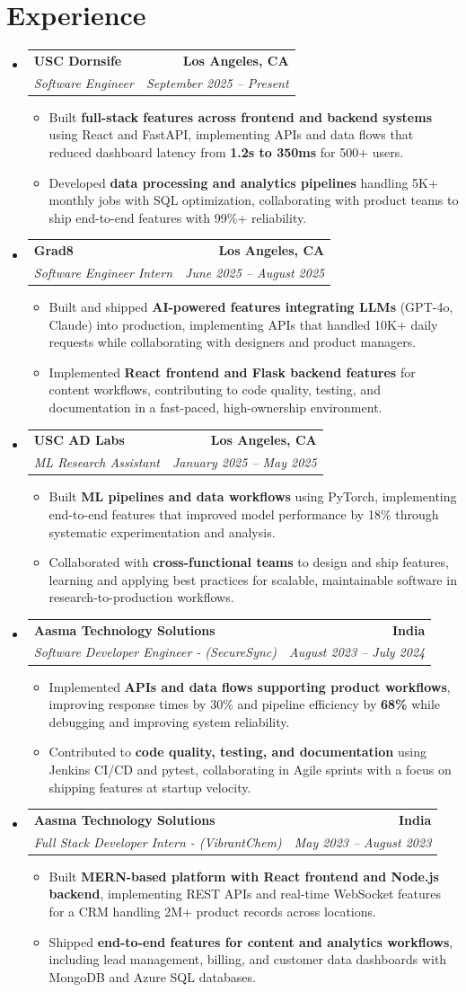 \documentclass[letterpaper,10pt]{article}
\makeatletter
\newcommand{\resumeItem}[1]{\item\small{{#1 \vspace{-2pt}}}}
\newcommand{\resumeSubheading}[4]{\vspace{-1pt}\item\begin{tabular*}{1.0\textwidth}[t]{l@{\extracolsep{\fill}}r}\textbf{#1} & \textbf{\small #2} \\\textit{\small#3} & \textit{\small #4} \\\end{tabular*}\vspace{-2pt}}
\newcommand{\resumeSubHeadingListStart}{\begin{itemize}[leftmargin=0.0in, label={}]}
\newcommand{\resumeSubHeadingListEnd}{\end{itemize}}
\newcommand{\resumeItemListStart}{\begin{itemize}[leftmargin=0.15in,label=\textbullet,itemsep=2pt,topsep=0pt,parsep=0pt,partopsep=0pt]}
\newcommand{\resumeItemListEnd}{\end{itemize}\vspace{-4pt}}
\makeatother
\begin{document}
\section{Experience}
\resumeSubHeadingListStart
\resumeSubheading{USC Dornsife}{Los Angeles, CA}{Software Engineer}{September 2025 -- Present}
\resumeItemListStart
\resumeItem{Built \textbf{full-stack features across frontend and backend systems} using React and FastAPI, implementing APIs and data flows that reduced dashboard latency from \textbf{1.2s to 350ms} for 500+ users.}
\resumeItem{Developed \textbf{data processing and analytics pipelines} handling 5K+ monthly jobs with SQL optimization, collaborating with product teams to ship end-to-end features with 99\%+ reliability.}
\resumeItemListEnd
\resumeSubheading{Grad8}{Los Angeles, CA}{Software Engineer Intern}{June 2025 -- August 2025}
\resumeItemListStart
\resumeItem{Built and shipped \textbf{AI-powered features integrating LLMs} (GPT-4o, Claude) into production, implementing APIs that handled 10K+ daily requests while collaborating with designers and product managers.}
\resumeItem{Implemented \textbf{React frontend and Flask backend features} for content workflows, contributing to code quality, testing, and documentation in a fast-paced, high-ownership environment.}
\resumeItemListEnd
\resumeSubheading{USC AD Labs}{Los Angeles, CA}{ML Research Assistant}{January 2025 -- May 2025}
\resumeItemListStart
\resumeItem{Built \textbf{ML pipelines and data workflows} using PyTorch, implementing end-to-end features that improved model performance by 18\% through systematic experimentation and analysis.}
\resumeItem{Collaborated with \textbf{cross-functional teams} to design and ship features, learning and applying best practices for scalable, maintainable software in research-to-production workflows.}
\resumeItemListEnd
\resumeSubheading{Aasma Technology Solutions}{India}{Software Developer Engineer - (SecureSync)}{August 2023 -- July 2024}
\resumeItemListStart
\resumeItem{Implemented \textbf{APIs and data flows supporting product workflows}, improving response times by 30\% and pipeline efficiency by \textbf{68\%} while debugging and improving system reliability.}
\resumeItem{Contributed to \textbf{code quality, testing, and documentation} using Jenkins CI/CD and pytest, collaborating in Agile sprints with a focus on shipping features at startup velocity.}
\resumeItemListEnd
\resumeSubheading{Aasma Technology Solutions}{India}{Full Stack Developer Intern - (VibrantChem)}{May 2023 -- August 2023}
\resumeItemListStart
\resumeItem{Built \textbf{MERN-based platform with React frontend and Node.js backend}, implementing REST APIs and real-time WebSocket features for a CRM handling 2M+ product records across locations.}
\resumeItem{Shipped \textbf{end-to-end features for content and analytics workflows}, including lead management, billing, and customer data dashboards with MongoDB and Azure SQL databases.}
\resumeItemListEnd
\resumeSubHeadingListEnd
\vspace{-14pt}
\end{document}
